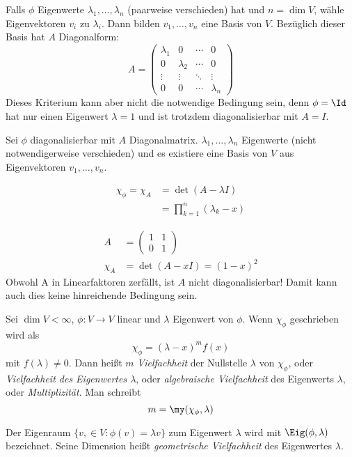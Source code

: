 \documentclass[a4paper, 10pt]{scrbook}
\begin{document}
Falls $\phi$ Eigenwerte $\lambda_1,\dotsc, \lambda_n$ (paarweise verschieden) hat und $n=\dim V$,
wähle Eigenvektoren $v_i$ zu $\lambda_i$.
Dann bilden $v_1,\dotsc, v_n$ eine Basis von $V$.
Bezüglich dieser Basis hat $A$ Diagonalform:
\[
A=\begin{pmatrix}\lambda_1&0&\cdots&0\\ 0&\lambda_2&\cdots&0\\ \vdots & \vdots & \ddots & \vdots \\0&0&\cdots& \lambda_n\end{pmatrix}
\]
Dieses Kriterium kann aber nicht die notwendige Bedingung sein, denn $\phi=\Id$ hat nur einen Eigenwert $\lambda=1$ und ist trotzdem diagonalisierbar mit $A=I$.

Sei $\phi$ diagonalisierbar mit $A$ Diagonalmatrix.
$\lambda_1,\dotsc,\lambda_n$ Eigenwerte (nicht notwendigerweise verschieden) und es existiere eine Basis von $V$ aus Eigenvektoren $v_1,\dotsc,v_n$.

\begin{align*}
\chi_\phi=\chi_A&=\det(A-\lambda I)\\
&=\prod_{k=1}^n(\lambda_k-x)
\end{align*}

\begin{ex}
\begin{align*}
A&= \begin{pmatrix}1&1\\0&1\end{pmatrix}\\
\chi_A&=\det(A-xI)=(1-x)^2
\end{align*}
Obwohl A in Linearfaktoren zerfällt, ist $A$ nicht diagonalisierbar! Damit kann auch dies keine hinreichende Bedingung sein.
\end{ex}


\begin{df}
\label{df:11.1}
Sei $\dim V<\infty$, $\phi:V\to V$ linear und $\lambda$ Eigenwert von $\phi$.
Wenn $\chi_\phi$ geschrieben wird als
\[
\chi_\phi=(\lambda - x)^m f(x)
\]
mit $f(\lambda)\neq 0$.
Dann heißt $m$ \emph{Vielfachheit} der Nullstelle $\lambda$ von $\chi_\phi$, oder \emph{Vielfachheit des Eigenwertes $\lambda$}, oder \emph{algebraische Vielfachheit} des Eigenwerts $\lambda$, oder \emph{Multiplizität}.
Man schreibt
\[
m=\my(\chi_\phi,\lambda)
\]

Der Eigenraum $\{v,\in V:\phi(v)=\lambda v\}$ zum Eigenwert $\lambda$ wird mit
$\Eig(\phi,\lambda)$ bezeichnet.
Seine Dimension heißt \emph{geometrische Vielfachheit} des Eigenwertes $\lambda$.
\end{df}
\end{document}
